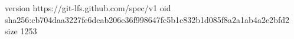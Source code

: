 version https://git-lfs.github.com/spec/v1
oid sha256:cb704daa3227fe6dcab206e36f998647fc5b1c832b1d085f8a2a1ab4a2e2bfd2
size 1253
